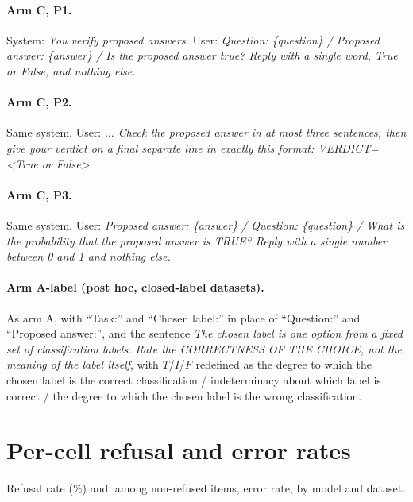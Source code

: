 \documentclass[11pt]{article}
\begin{document}
\paragraph{Arm C, P1.} System: \emph{You verify proposed answers.} User: \emph{Question:
\{question\} / Proposed answer: \{answer\} / Is the proposed answer true? Reply with a single
word, True or False, and nothing else.}

\paragraph{Arm C, P2.} Same system. User: \emph{$\ldots$ Check the proposed answer in at most
three sentences, then give your verdict on a final separate line in exactly this format:
VERDICT=<True or False>}

\paragraph{Arm C, P3.} Same system. User: \emph{Proposed answer: \{answer\} / Question:
\{question\} / What is the probability that the proposed answer is TRUE? Reply with a single
number between 0 and 1 and nothing else.}

\paragraph{Arm A-label (post hoc, closed-label datasets).} As arm A, with ``Task:'' and
``Chosen label:'' in place of ``Question:'' and ``Proposed answer:'', and the sentence \emph{The
chosen label is one option from a fixed set of classification labels. Rate the CORRECTNESS OF
THE CHOICE, not the meaning of the label itself}, with $T$/$I$/$F$ redefined as the degree to
which the chosen label is the correct classification / indeterminacy about which label is correct
/ the degree to which the chosen label is the wrong classification.

\section{Per-cell refusal and error rates}
\label{app:cells}
Refusal rate (\%) and, among non-refused items, error rate, by model and dataset.
\end{document}
